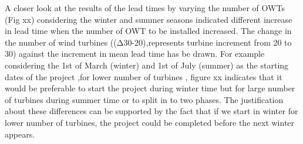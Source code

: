 A closer look at the results of the lead times by varying the number of OWTs (Fig xx) considering the winter and summer seasons indicated different increase in lead time when the number of OWT to be installed increased. The change in the number of wind turbines ((Δ30-20),represents turbine increment from 20 to 30) against the increment in mean lead time has be drawn. For example considering the 1st of March (winter) and 1st of July (summer) as the starting dates of the project ,for lower number of turbines , figure xx indicates that it would be preferable to start the project during winter time but for large number of turbines during summer time or to split in to two phases. The justification about these differences can be supported by the fact that if we start in winter for lower number of turbines, the project could be completed before the next winter appears. 